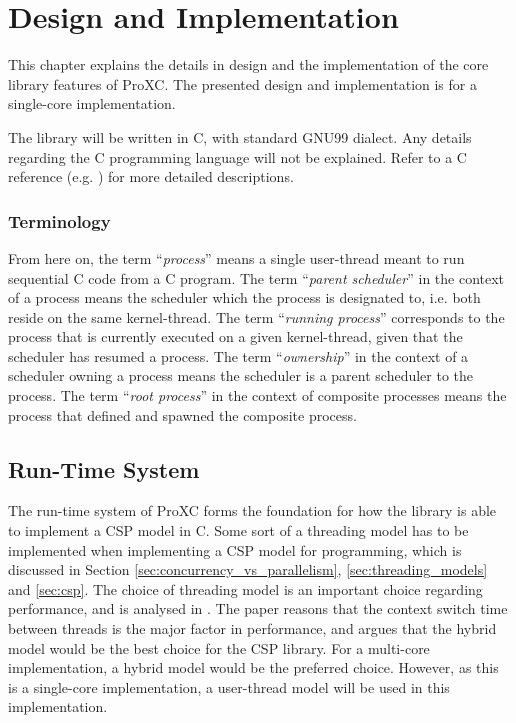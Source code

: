 

\chapter{Design and Implementation}
\label{ch:design_implementation}

This chapter explains the details in design and the implementation of the core library features of ProXC. The presented design and implementation is for a single\hyp{}core implementation. 

The library will be written in C, with standard GNU99 dialect. Any details regarding the C programming language will not be explained. Refer to a C reference (e.g. \citet{k&r}) for more detailed descriptions.   


\subsection*{Terminology}

From here on, the term ``\textit{process}'' means a single user\hyp{}thread meant to run sequential C code from a C program. The term ``\textit{parent scheduler}'' in the context of a process means the scheduler which the process is designated to, i.e. both reside on the same kernel\hyp{}thread. The term ``\textit{running process}'' corresponds to the process that is currently executed on a given kernel\hyp{}thread, given that the scheduler has resumed a process. The term ``\textit{ownership}'' in the context of a scheduler owning a process means the scheduler is a parent scheduler to the process. The term ``\textit{root process}'' in the context of composite processes means the process that defined and spawned the composite process.


\section{Run\hyp{}Time System}
\label{sec:run-time_system}

The run\hyp{}time system of ProXC forms the foundation for how the library is able to implement a CSP model in C. Some sort of a threading model has to be implemented when implementing a CSP model for programming, which is discussed in Section \ref{sec:concurrency_vs_parallelism}, \ref{sec:threading_models} and \ref{sec:csp}. The choice of threading model is an important choice regarding performance, and is analysed in \citet[chapter 1]{c++csp2}. The paper reasons that the context switch time between threads is the major factor in performance, and argues that the hybrid model would be the best choice for the CSP library. For a multi\hyp{}core implementation, a hybrid model would be the preferred choice. However, as this is a single\hyp{}core implementation, a user\hyp{}thread model will be used in this implementation.

